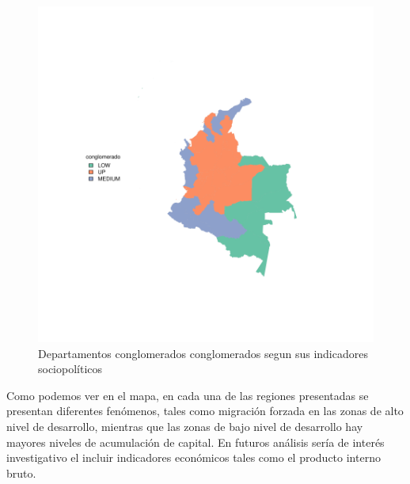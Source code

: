 \documentclass{article}
\begin{document}
\begin{figure}[h]
\centering
\includegraphics{Articulo1-plotMap1}
\caption{Departamentos conglomerados conglomerados segun sus indicadores sociopolíticos}\label{clustmap}
\end{figure}

Como podemos ver en el mapa, en cada una de las regiones presentadas se presentan diferentes fenómenos, tales como migración forzada en las zonas de alto nivel de desarrollo, mientras que las zonas de bajo nivel de desarrollo hay mayores niveles de acumulación de capital. En futuros análisis sería de interés investigativo el incluir indicadores económicos tales como el producto interno bruto.
\clearpage


\renewcommand{\refname}{Bibliografia}

\end{document}
